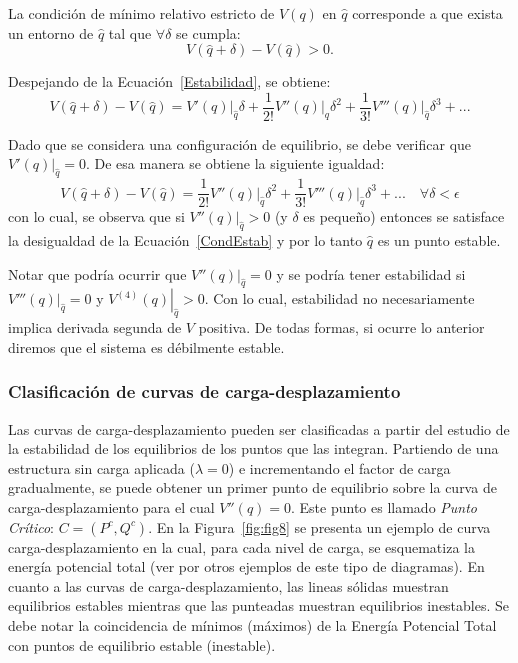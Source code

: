 La condición de mínimo relativo estricto de $V(q)$ en $\hat{q}$ corresponde a que exista un entorno de $\hat{q}$ tal que $\forall \delta$ se cumpla:
%
\begin{equation}\label{CondEstab}
V(\hat{q}+\delta) - V(\hat{q}) > 0.
\end{equation}

Despejando de la Ecuación~\eqref{Estabilidad}, se obtiene:
%
\begin{equation}
V(\hat{q}+\delta) - V(\hat{q}) = \left. V'(q)\right|_{\hat{q}}\delta + \frac{1}{2!} \left.V''(q)\right|_{\hat{q}} \delta^2 +\frac{1}{3!} \left.V'''(q)\right|_{\hat{q}} \delta^3 +... 
\end{equation}

Dado que se considera una configuración de equilibrio, se debe verificar que $\left. V'(q)\right|_{\hat{q}}=0$. %
%
De esa manera se obtiene la siguiente igualdad:
%
\begin{equation}
V(\hat{q}+\delta) - V(\hat{q}) =	\frac{1}{2!} \left.V''(q)\right|_{\hat{q}} \delta^2 +\frac{1}{3!} \left.V'''(q)\right|_{\hat{q}} \delta^3 +...  \quad  \forall \delta < \epsilon
\end{equation}
%
con lo cual, se observa que si $\left.V''(q)\right|_{\hat{q}}>0$ (y $\delta$ es pequeño) entonces se satisface la desigualdad de la Ecuación~\eqref{CondEstab} y por lo tanto $\hat{q}$ es un punto estable.


Notar que podría ocurrir que $\left.V''(q)\right|_{\hat{q}}=0$ y se podría tener estabilidad si $\left.V'''(q)\right|_{\hat{q}}=0$ y $\left.V^{(4)}(q)\right|_{\hat{q}}>0$. Con lo cual, estabilidad no necesariamente implica derivada segunda de $V$ positiva. De todas formas, si ocurre lo anterior diremos que el sistema es débilmente estable.

\subsubsection{Clasificación de curvas de carga-desplazamiento}

Las curvas de carga-desplazamiento pueden ser clasificadas a partir del estudio de la estabilidad de los equilibrios de los puntos que las integran. %
%
Partiendo de una estructura sin carga aplicada ($\lambda=0$) e incrementando el factor de carga gradualmente, se puede obtener un primer punto de equilibrio sobre la curva de carga-desplazamiento para el cual $V''(q)=0$. %
%
Este punto es llamado \textit{Punto Crítico}: $C=(P^c,Q^c)$. %
%
En la Figura~\ref{fig:fig8} se presenta un ejemplo de curva carga-desplazamiento en la cual, para cada nivel de carga, se esquematiza la energía potencial total (ver \citep{thompson1973general} por otros ejemplos de este tipo de diagramas). %
%
En cuanto a las curvas de carga-desplazamiento, las lineas sólidas muestran equilibrios estables mientras que las punteadas muestran equilibrios inestables. Se debe notar la coincidencia de mínimos (máximos) de la Energía Potencial Total con puntos de equilibrio estable (inestable).

